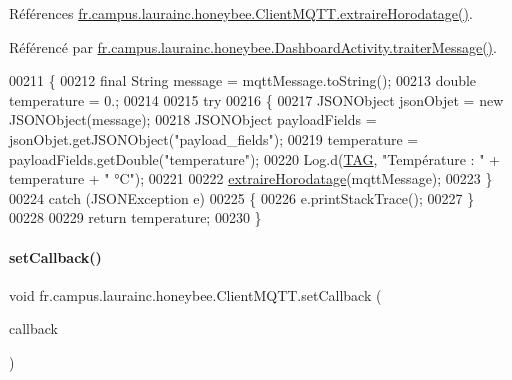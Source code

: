 Références \hyperlink{classfr_1_1campus_1_1laurainc_1_1honeybee_1_1_client_m_q_t_t_ace17d633909a5be8035518b9a6b528c2}{fr.\+campus.\+laurainc.\+honeybee.\+Client\+M\+Q\+T\+T.\+extraire\+Horodatage()}.



Référencé par \hyperlink{classfr_1_1campus_1_1laurainc_1_1honeybee_1_1_dashboard_activity_a50d4c14e993ff1779ae5dce8cee11216}{fr.\+campus.\+laurainc.\+honeybee.\+Dashboard\+Activity.\+traiter\+Message()}.


\begin{DoxyCode}
00211     \{
00212         \textcolor{keyword}{final} String message = mqttMessage.toString();
00213         \textcolor{keywordtype}{double} temperature = 0.;
00214 
00215         \textcolor{keywordflow}{try}
00216         \{
00217             JSONObject jsonObjet = \textcolor{keyword}{new} JSONObject(message);
00218             JSONObject payloadFields = jsonObjet.getJSONObject(\textcolor{stringliteral}{"payload\_fields"});
00219             temperature = payloadFields.getDouble(\textcolor{stringliteral}{"temperature"});
00220             Log.d(\hyperlink{classfr_1_1campus_1_1laurainc_1_1honeybee_1_1_client_m_q_t_t_a378324f705f8d7870c5f7be0cea02890}{TAG}, \textcolor{stringliteral}{"Température : "} + temperature + \textcolor{stringliteral}{" °C"});
00221 
00222             \hyperlink{classfr_1_1campus_1_1laurainc_1_1honeybee_1_1_client_m_q_t_t_ace17d633909a5be8035518b9a6b528c2}{extraireHorodatage}(mqttMessage);
00223         \}
00224         \textcolor{keywordflow}{catch} (JSONException e)
00225         \{
00226             e.printStackTrace();
00227         \}
00228 
00229         \textcolor{keywordflow}{return} temperature;
00230     \}
\end{DoxyCode}
\mbox{\label{classfr_1_1campus_1_1laurainc_1_1honeybee_1_1_client_m_q_t_t_ace2e0a1f888cb34e2a5a5c241eb6b94a}} 
\paragraph{\texorpdfstring{set\+Callback()}{setCallback()}}
{\footnotesize\ttfamily void fr.\+campus.\+laurainc.\+honeybee.\+Client\+M\+Q\+T\+T.\+set\+Callback (\begin{DoxyParamCaption}\item[{Mqtt\+Callback\+Extended}]{callback }\end{DoxyParamCaption})}



